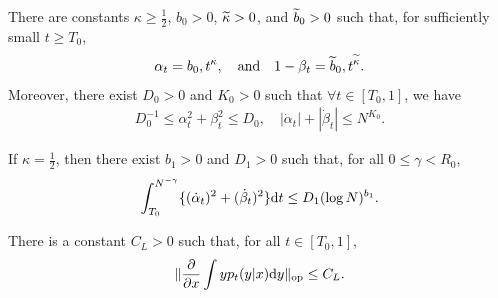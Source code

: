 \begin{assumption}\label{ass:A3}
There are constants $\kappa \geq \frac{1}{2}$, $b_0>0$, $\widetilde{\kappa}>0$, and $\widetilde{b}_0>0$ such that, for sufficiently small $t \geq T_0$,
\begin{align*}
  \alpha_t  =  b_0, t^{\kappa},
  \quad\mathrm{and}\quad
  1 - \beta_t  =  \widetilde{b}_0, t^{\widetilde{\kappa}}.
\end{align*}
Moreover, there exist $D_0 > 0$ and $K_0 > 0$ such that $\forall t \in [T_0,1]$, we have
\begin{align*}
  D_0^{-1}  \leq  \alpha_t^2 + \beta_t^2   \leq   D_0,
  \quad
   |\dot{\alpha}_t | +  |\dot{\beta}_t|  \leq   N^{K_0}.
\end{align*}
\end{assumption}

\begin{assumption}[Additional bound in the critical case $\kappa = \frac{1}{2}$]\label{ass:A4}
If $\kappa = \frac{1}{2}$, then there exist $b_1>0$ and $D_1>0$ such that, for all $0 \leq \gamma < R_0$,
\begin{align*}
\int_{T_0}^{N^{-\gamma}} \{ (\dot{\alpha}_t )^2 +  (\dot{\beta}_t )^2 \} \mathrm{d} t \leq  
D_1  (\log N )^{b_1}.
\end{align*}
\end{assumption}

\begin{assumption}\label{ass:A5}
There is a constant $C_L > 0$ such that, for all $t \in [T_0, 1]$,
\begin{align*}
\| \frac{\partial}{\partial x} \int y p_t(y | x) \mathrm{d} y \|_{\mathrm{op}} \leq  C_L.
\end{align*}
\end{assumption}

